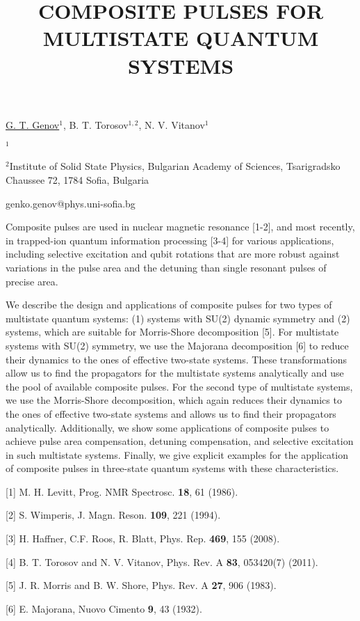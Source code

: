 \title{COMPOSITE PULSES FOR MULTISTATE QUANTUM SYSTEMS}

\underline{G. T. Genov}$^{1}$, B. T. Torosov$^{1,2}$, N. V. Vitanov$^{1}$
  

{\normalsize{

\vspace{-4mm} $^1$\unisofia

\vspace{-4mm} $^2$Institute of Solid State Physics, Bulgarian Academy of Sciences, Tsarigradsko Chaussee 72, 1784 Sofia, Bulgaria

\email genko.genov@phys.uni-sofia.bg}}

Composite pulses are used in nuclear magnetic resonance [1-2], and most recently, in trapped-ion quantum information processing [3-4] for various applications, including selective excitation and qubit rotations that are more robust against variations in the pulse area and the detuning than single resonant pulses of precise area.

We describe the design and applications of composite pulses for two types of multistate quantum systems: (1) systems with SU(2) dynamic symmetry and (2) systems, which are suitable for Morris-Shore decomposition [5]. For multistate systems with SU(2) symmetry, we use the Majorana decomposition [6] to reduce their dynamics to the ones of effective two-state systems. These transformations allow us to find the propagators for the multistate systems analytically and use the pool of available composite pulses. For the second type of multistate systems, we use the Morris-Shore decomposition, which again reduces their dynamics to the ones of effective two-state systems and allows us to find their propagators analytically. Additionally, we show some applications of composite pulses to achieve pulse area compensation, detuning compensation, and selective excitation in such multistate systems. Finally, we give explicit examples for the application of composite pulses in three-state quantum systems with these characteristics.

{\normalsize
[1] M. H. Levitt, Prog. NMR Spectrosc. \textbf{18}, 61 (1986).
\vsp

[2] S. Wimperis, J. Magn. Reson. \textbf{109}, 221 (1994).
\vsp

[3] H. Haffner, C.F. Roos, R. Blatt, Phys. Rep. \textbf{469}, 155 (2008).
\vsp

[4] B. T. Torosov and N. V. Vitanov, Phys. Rev. A \textbf{83}, 053420(7) (2011).
\vsp

[5] J. R. Morris and B. W. Shore, Phys. Rev. A \textbf{27}, 906 (1983).
\vsp

[6] E. Majorana, Nuovo Cimento \textbf{9}, 43 (1932).
}

\vspace{\baselineskip} 